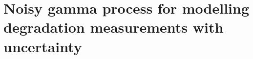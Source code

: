 \chapter{Noisy gamma process for modelling degradation measurements with uncertainty}\label{chap:chapter5}